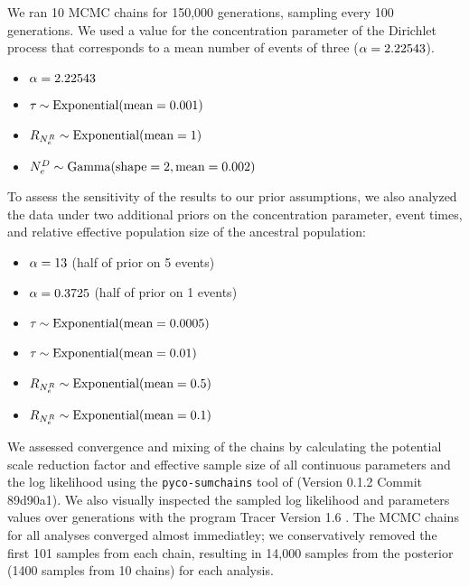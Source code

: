 We ran 10 MCMC chains for 150,000 generations, sampling every 100 generations.
We used a value for the concentration parameter of the Dirichlet process
that corresponds to a mean number of events of three
($\concentration = 2.22543$).
\begin{itemize}
    \item $\concentration = 2.22543$
    \item $\etime \sim \dexponential{0.001}$
    \item $\rootrelativepopsize \sim \dexponential{1}$
    \item $\epopsize[\descendantpopindex{}] \sim \dgamma{2}{0.002}$
\end{itemize}
To assess the sensitivity of the results to our prior assumptions,
we also analyzed the data under two additional priors on
the concentration parameter, event times, and relative
effective population size of the ancestral population:
\begin{itemize}
    \item $\concentration = 13$ (half of prior on 5 events)
    \item $\concentration = 0.3725$ (half of prior on 1 events)
    \item $\etime \sim \dexponential{0.0005}$
    \item $\etime \sim \dexponential{0.01}$
    \item $\rootrelativepopsize \sim \dexponential{0.5}$
    \item $\rootrelativepopsize \sim \dexponential{0.1}$
\end{itemize}

We assessed convergence and mixing of the chains by calculating the potential
scale reduction factor \citep[PSRF; the square root of Equation 1.1 in][]{Brooks1998}
and effective sample size \citep{Gong2014} of all continuous parameters and the
log likelihood using the \texttt{pyco-sumchains} tool of \pycoevolity
(Version 0.1.2 Commit 89d90a1).
We also visually inspected the sampled log likelihood and parameters values
over generations with the program Tracer Version 1.6 \citep{Tracer16}.
The MCMC chains for all analyses converged almost immediatley; we
conservatively removed the first 101 samples from each chain, resulting in
14,000 samples from the posterior (1400 samples from 10 chains) for each
analysis.


